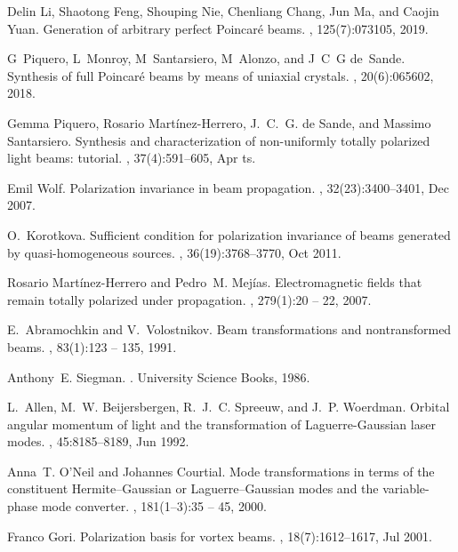 \documentclass{article}
\begin{document}
\begin{thebibliography}{10}
	Delin Li, Shaotong Feng, Shouping Nie, Chenliang Chang, Jun Ma, and Caojin
	Yuan.
	\newblock Generation of arbitrary perfect {Poincar\'e} beams.
	, 125(7):073105, 2019.
	
	G~Piquero, L~Monroy, M~Santarsiero, M~Alonzo, and J~C~G de~Sande.
	\newblock Synthesis of full {Poincar\'e} beams by means of uniaxial crystals.
	, 20(6):065602, 2018.
	
	Gemma Piquero, Rosario {Mart\'{i}nez-Herrero}, J.~C.~G. {de Sande}, and Massimo
	Santarsiero.
	\newblock Synthesis and characterization of non-uniformly totally polarized
	light beams: tutorial.
	, 37(4):591--605, Apr ts.
	
	Emil Wolf.
	\newblock Polarization invariance in beam propagation.
	, 32(23):3400--3401, Dec 2007.
	
	O.~Korotkova.
	\newblock Sufficient condition for polarization invariance of beams generated
	by quasi-homogeneous sources.
	, 36(19):3768--3770, Oct 2011.
	
	Rosario Martínez-Herrero and Pedro~M. Mejías.
	\newblock Electromagnetic fields that remain totally polarized under
	propagation.
	, 279(1):20 -- 22, 2007.
	
	E.~Abramochkin and V.~Volostnikov.
	\newblock Beam transformations and nontransformed beams.
	, 83(1):123 -- 135, 1991.
	
	Anthony~E. Siegman.
	.
	\newblock University Science Books, 1986.
	
	L.~Allen, M.~W. Beijersbergen, R.~J.~C. Spreeuw, and J.~P. Woerdman.
	\newblock Orbital angular momentum of light and the transformation of
	{Laguerre-Gaussian} laser modes.
	, 45:8185--8189, Jun 1992.
	
	Anna~T. O'Neil and Johannes Courtial.
	\newblock Mode transformations in terms of the constituent {Hermite–Gaussian}
	or {Laguerre–Gaussian} modes and the variable-phase mode converter.
	, 181(1–3):35 -- 45, 2000.
	
	Franco Gori.
	\newblock Polarization basis for vortex beams.
	, 18(7):1612--1617, Jul 2001.
	

\end{thebibliography}
\end{document}
